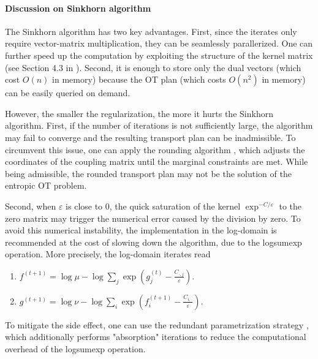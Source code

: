 
\paragraph{Discussion on Sinkhorn algorithm}
The Sinkhorn algorithm has two key advantages. First, since the iterates only require
vector-matrix multiplication, they can be seamlessly parallerized.
One can further speed up the computation by exploiting the structure of the kernel matrix
(see Section 4.3 in \citep{Peyre19}). Second, it is enough to store only the dual vectors
(which cost $O(n)$ in memory) because the OT plan (which costs $O(n^2)$ in memory)
can be easily queried on demand.

However, the smaller the regularization, the more it hurts the Sinkhorn algorithm.
First, if the number of iterations is not sufficiently large,
the algorithm may fail to converge and the resulting transport plan can be inadmissible.
To circumvent this issue, one can apply the rounding algorithm \citep{Altschuler17},
which adjusts the coordinates of the coupling matrix until the marginal constraints are met.
While being admissible, the rounded transport plan may not be the solution of the entropic OT problem.

Second, when $\varepsilon$ is close to $0$, the quick saturation of the kernel
$\exp^{-C / \varepsilon}$ to the zero matrix may trigger the numerical error caused by the division by zero.
To avoid this numerical instability, the implementation in the log-domain is recommended
at the cost of slowing down the algorithm, due to the logsumexp operation.
More precisely, the log-domain iterates read
\begin{enumerate}
  \item $f^{(t+1)} = \log \mu - \log \sum_j \exp \left( g_j^{(t)} - \frac{C_{\cdot, j}}{\varepsilon} \right)$.
  \item $g^{(t+1)} = \log \nu - \log \sum_i \exp \left( f_i^{(t+1)} - \frac{C_{i, \cdot}}{\varepsilon} \right)$.
\end{enumerate}
To mitigate the side effect, one can use the redundant parametrization strategy
\citep{Chizat18a,Schmitzer19}, which additionally performs "absorption" iterations
to reduce the computational overhead of the logsumexp operation.

